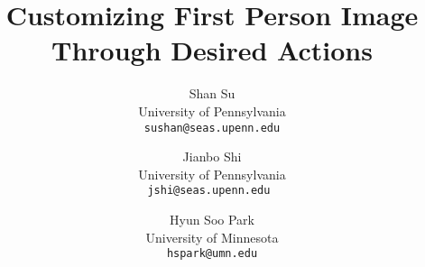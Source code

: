 \documentclass[10pt,twocolumn,letterpaper]{article}
\begin{document}
\title{Customizing First Person Image Through Desired Actions}

\author{Shan Su\\
University of Pennsylvania\\
{\tt\small sushan@seas.upenn.edu}
\and
Jianbo Shi\\
University of Pennsylvania\\
{\tt\small jshi@seas.upenn.edu }
\and
Hyun Soo Park\\
University of Minnesota\\
{\tt\small hspark@umn.edu}
}

\maketitle
\end{document}
